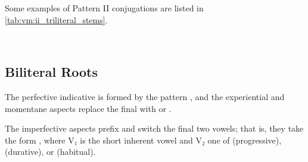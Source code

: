 \documentclass[grammar]{subfiles}
\begin{document}
Some examples of Pattern II conjugations are listed in \cref{tab:vm:ii_triliteral_stems}.

\begin{table}[h!]\small\capstart
  \centering
  \\
  \caption{Pattern II triliteral stems \label{tab:vm:ii_triliteral_stems}}
\end{table}


\subsection{Biliteral Roots}
\label{ssec:vm:ii_biliteral}

The perfective indicative is formed by the pattern , and the
experiential and momentane aspects replace the final  with  or
.

The imperfective aspects prefix  and switch the final two vowels; that
is, they take the form , where V₁ is the short inherent vowel
and V₂ one of  (progressive),  (durative), or  (habitual).
\end{document}
